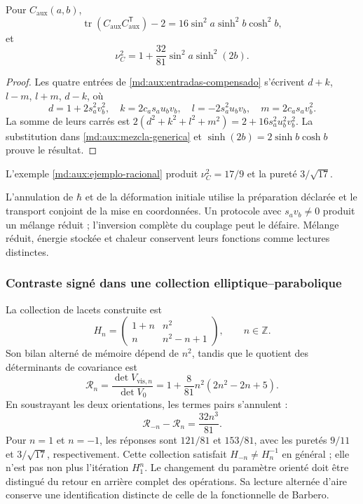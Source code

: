 \begin{corollary}
\label{md:aux:cor-mezcla}
Pour $C_{\mathrm{aux}}(a,b)$,
\begin{equation}
 \operatorname{tr}(C_{\mathrm{aux}}C_{\mathrm{aux}}^{\mathsf T})-2
 =16\sin^2a\sinh^2b\cosh^2b,
 \label{md:aux:traza-cuadratica}
\end{equation}
et
\begin{equation}
 \boxed{\nu_C^2=1+\frac{32}{81}\sin^2a\sinh^2(2b).}
 \label{md:aux:mezcla-compensado}
\end{equation}
\end{corollary}
\begin{proof}
Les quatre entrées de \eqref{md:aux:entradas-compensado}
s’écrivent $d+k$, $l-m$, $l+m$, $d-k$, où
\[
 d=1+2s_a^2v_b^2,\quad k=2c_as_au_bv_b,\quad
 l=-2s_a^2u_bv_b,\quad m=2c_as_av_b^2.
\]
La somme de leurs carrés est
$2(d^2+k^2+l^2+m^2)=2+16s_a^2u_b^2v_b^2$.
La substitution dans \eqref{md:aux:mezcla-generica} et
$\sinh(2b)=2\sinh b\cosh b$ prouve le résultat.
\end{proof}
L’exemple \eqref{md:aux:ejemplo-racional} produit
$\nu_C^2=17/9$ et la pureté $3/\sqrt{17}$.

L’annulation de $\hbar$ et de la déformation initiale utilise
la préparation déclarée et le transport conjoint de la mise en coordonnées.
Un protocole avec $s_av_b\ne0$ produit un mélange réduit ;
l’inversion complète du couplage peut le défaire. Mélange
réduit, énergie stockée et chaleur conservent leurs fonctions
comme lectures distinctes.

\subsubsection{Contraste signé dans une collection elliptique--parabolique}
\label{md:aux:familia-hn}

La collection de lacets construite est
\begin{equation}
 H_n=\begin{pmatrix}1+n&n^2\\n&n^2-n+1\end{pmatrix},
 \qquad n\in\mathbb Z.
 \label{md:aux:hn}
\end{equation}
Son bilan alterné de mémoire dépend de $n^2$, tandis que le
quotient des déterminants de covariance est
\begin{equation}
 \mathcal R_n=\frac{\det V_{\mathrm{vis},n}}{\det V_0}
 =1+\frac8{81}n^2(2n^2-2n+5).
 \label{md:aux:covarianza-hn}
\end{equation}
En soustrayant les deux orientations, les termes pairs s’annulent :
\begin{equation}
 \boxed{\mathcal R_{-n}-\mathcal R_n=\frac{32n^3}{81}.}
 \label{md:aux:diferencia-direccional}
\end{equation}
Pour $n=1$ et $n=-1$, les réponses sont $121/81$ et $153/81$,
avec les puretés $9/11$ et $3/\sqrt{17}$, respectivement.
Cette collection satisfait $H_{-n}\ne H_n^{-1}$ en général ;
elle n’est pas non plus l’itération $H_1^n$. Le changement du paramètre
orienté doit être distingué du retour en arrière complet des
opérations. Sa lecture alternée d’aire conserve une
identification distincte de celle de la fonctionnelle de Barbero.

